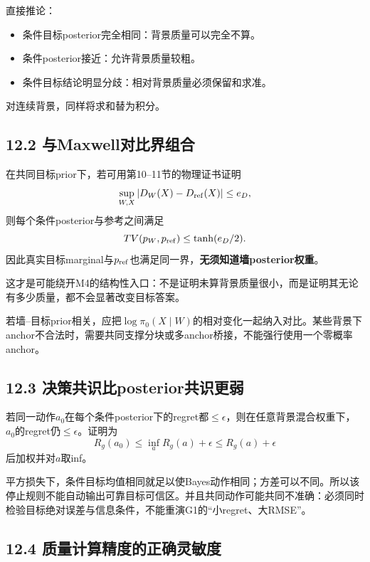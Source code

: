 \documentclass[
  10pt,
  a4paper,
]{article}
\providecommand{\tightlist}{%
  \setlength{\itemsep}{0pt}\setlength{\parskip}{0pt}}
\providecommand{\tightlist}{\setlength{\itemsep}{1pt}\setlength{\parskip}{1pt}}
\begin{document}
直接推论：

\begin{itemize}
\tightlist
\item
  条件目标posterior完全相同：背景质量可以完全不算。
\item
  条件posterior接近：允许背景质量较粗。
\item
  条件目标结论明显分歧：相对背景质量必须保留和求准。
\end{itemize}

对连续背景，同样将求和替为积分。

\hypertarget{ux4e0emaxwellux5bf9ux6bd4ux754cux7ec4ux5408}{%
\subsection{12.2
与Maxwell对比界组合}\label{ux4e0emaxwellux5bf9ux6bd4ux754cux7ec4ux5408}}

在共同目标prior下，若可用第10--11节的物理证书证明 \[
\sup_{W,X}|D_W(X)-D_{\rm ref}(X)|\le e_D,
\] 则每个条件posterior与参考之间满足 \[
TV(p_W,p_{\rm ref})\le\tanh(e_D/2).
\]
因此真实目标marginal与\(p_{\rm ref}\)也满足同一界，\textbf{无须知道墙posterior权重}。

这才是可能绕开M4的结构性入口：不是证明未算背景质量很小，而是证明其无论有多少质量，都不会显著改变目标答案。

若墙--目标prior相关，应把\(\log\pi_0(X\mid W)\)的相对变化一起纳入对比。某些背景下anchor不合法时，需要共同支撑分块或多anchor桥接，不能强行使用一个零概率anchor。

\hypertarget{ux51b3ux7b56ux5171ux8bc6ux6bd4posteriorux5171ux8bc6ux66f4ux5f31}{%
\subsection{12.3
决策共识比posterior共识更弱}\label{ux51b3ux7b56ux5171ux8bc6ux6bd4posteriorux5171ux8bc6ux66f4ux5f31}}

若同一动作\(a_0\)在每个条件posterior下的regret都\(\le\epsilon\)，则在任意背景混合权重下，\(a_0\)的regret仍\(\le\epsilon\)。证明为
\[
R_g(a_0)\le \inf_aR_g(a)+\epsilon
\le R_g(a)+\epsilon
\] 后加权并对\(a\)取inf。

平方损失下，条件目标均值相同就足以使Bayes动作相同；方差可以不同。所以该停止规则不能自动输出可靠目标可信区。并且共同动作可能共同不准确：必须同时检验目标绝对误差与信息条件，不能重演G1的``小regret、大RMSE''。

\hypertarget{ux8d28ux91cfux8ba1ux7b97ux7cbeux5ea6ux7684ux6b63ux786eux7075ux654fux5ea6}{%
\subsection{12.4
质量计算精度的正确灵敏度}\label{ux8d28ux91cfux8ba1ux7b97ux7cbeux5ea6ux7684ux6b63ux786eux7075ux654fux5ea6}}
\end{document}
